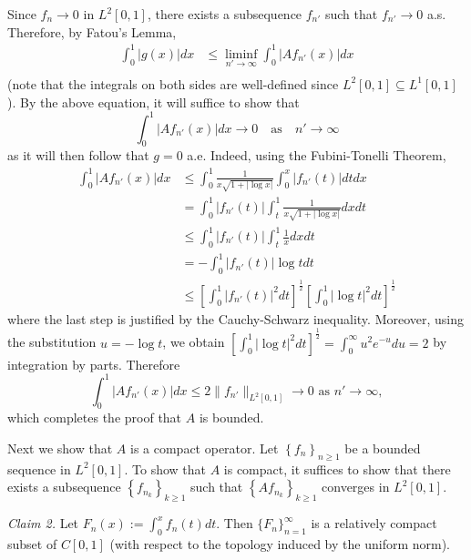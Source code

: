 \documentclass[answers]{exam}
\begin{document}
\begin{questions}
\begin{solution}
Since $f_{n}\to 0$ in $L^{2}[0,1]$, there exists a subsequence $f_{n'}$ such
that $f_{n'}\to 0$ a.s. Therefore, by Fatou's Lemma,
\begin{align*}
  \int_{0}^{1}|g(x)|dx 
  &\leq \liminf_{n'\to\infty}\int_{0}^{1}|Af_{n'}(x)|dx \\
\end{align*}
(note that the integrals on both sides are well-defined since
$L^{2}[0,1]\subseteq L^{1}[0,1]$).
By the above equation, it will suffice to show that
\begin{equation*}
  \int_{0}^{1}|Af_{n'}(x)|dx \to 0
  \quad \text{as} \quad n'\to \infty
\end{equation*}
as it will then follow that $g=0$ a.e. Indeed, using the Fubini-Tonelli Theorem,
\begin{align*}
  \int_{0}^{1}|Af_{n'}(x)|dx
  &\leq \int_{0}^{1}\frac{1}{x \sqrt{1+|\log x|}} \int_{0}^{x}|f_{n'}(t)|dt dx\\ 
  &= \int_{0}^{1}|f_{n'}(t)| \int_{t}^{1}\frac{1}{x \sqrt{1+|\log x|}}  dx dt\\
  &\leq \int_{0}^{1}|f_{n'}(t)| \int_{t}^{1}\frac{1}{x}dxdt\\  
  &= -\int_{0}^{1}|f_{n'}(t)| \log t dt\\
  &\leq \left[ \int_{0}^{1}|f_{n'}(t)|^{2}dt  \right]^{\frac{1}{2}}\left[ \int_{0}^{1} |\log t|^{2} dt \right]^{\frac{1}{2}}
\end{align*}
where the last step is justified by the Cauchy-Schwarz inequality. Moreover,
using the substitution $u = -\log t$, we obtain
$\left[ \int_{0}^{1} |\log t|^{2} dt \right]^{\frac{1}{2}} =
\int_{0}^{\infty}u^{2}e^{-u}du=2$ by integration by parts. Therefore
\begin{equation*}
  \int_{0}^{1}|Af_{n'}(x)|dx \leq  2 \|f_{n'}\|_{L^{2}[0,1]} \to 0 \text{ as }n'\to \infty,
\end{equation*}
which completes the proof that $A$ is bounded.



  Next we show that $A$ is a compact operator. Let $\left\{ f_{n} \right\}_{n\geq 1}$ be a bounded sequence in $L^{2}[0,1]$. To show that $A$ is compact, it suffices to show that there exists a subsequence $\left\{ f_{n_{k}} \right\}_{k\geq 1}$ such that $\left\{ Af_{n_{k}} \right\}_{k\geq 1}$ converges in $L^{2}[0,1]$.

  
  \textit{Claim 2.} Let $F_{n}(x):=\int_{0}^{x}f_{n}(t)dt$. Then $\{F_{n}\}_{n=1}^{\infty}$ is a relatively compact subset of $C[0,1]$ (with respect to the topology induced by the uniform norm).


\end{solution}
\end{questions}
\end{document}
